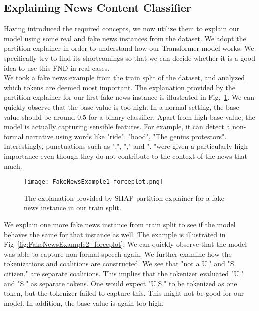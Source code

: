 \subsection{Explaining News Content Classifier}
\label{subsec:ExplainingNewsContentModels_ExplainingNewsContentClassifier}
Having introduced the required concepts, we now utilize them to explain our model using some real and fake news instances from the dataset. We adopt the partition explainer in order to understand how our Transformer model works. We specifically try to find its shortcomings so that we can decide whether it is a good idea to use this FND in real cases.\\
We took a fake news example from the train split of the dataset, and analyzed which tokens are deemed most important. The explanation provided by the partition explainer for our first fake news instance is illustrated in Fig.~\ref{fig:FakeNewsExample1_forceplot}. We can quickly observe that the base value is too high. In a normal setting, the base value should be around $0.5$ for a binary classifier. Apart from high base value, the model is actually capturing sensible features. For example, it can detect a non-formal narrative using words like "ride", "hood", "The genius protestors".  Interestingly, punctuations such as ".", "," and ". "were given a particularly high importance even though they do not contribute to the context of the news that much.\\
\begin{figure}
    \centering
    \texttt{[image: FakeNewsExample1\_forceplot.png]}
    \caption[The explanation provided by SHAP partition explainer for a fake news instance in our train split.]{The explanation provided by SHAP partition explainer for a fake news instance in our train split.}
    \label{fig:FakeNewsExample1_forceplot}
\end{figure}
We explain one more fake news instance from train split to see if the model behaves the same for that instance as well. The example is illustrated in Fig~\ref{fig:FakeNewsExample2_forceplot}. We can quickly observe that the model was able to capture non-formal speech again. We further examine how the tokenizations and coalitions are constructed. We see that "not a U." and "S. citizen." are separate coalitions. This implies that the tokenizer evaluated "U." and "S." as separate tokens. One would expect "U.S." to be tokenized as one token, but the tokenizer failed to capture this. This might not be good for our model. In addition,  the base value is again too high.\\

